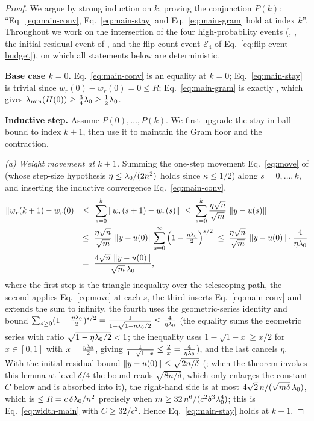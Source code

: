\begin{proof}
We argue by strong induction on $k$, proving the conjunction
$P(k)$: ``Eq.~\eqref{eq:main-conv}, Eq.~\eqref{eq:main-stay} and Eq.~\eqref{eq:main-gram} hold at index $k$''. Throughout we
work on the intersection of the four high-probability events (,
, the initial-residual event of , and the
flip-count event $\mathcal{E}_4$ of Eq.~\eqref{eq:flip-event-budget}), on which all statements
below are deterministic.

\smallskip\noindent\textbf{Base case $k = 0$.}
Eq.~\eqref{eq:main-conv} is an equality at $k=0$; Eq.~\eqref{eq:main-stay} is trivial since
$w_r(0) - w_r(0) = 0 \le R$; Eq.~\eqref{eq:main-gram} is exactly
, which gives $\lambda_{\min}(H(0)) \ge \tfrac34\lambda_{0} \ge \tfrac12\lambda_{0}$.

\smallskip\noindent\textbf{Inductive step.}
Assume $P(0), \dots, P(k)$. We first upgrade the stay-in-ball bound to index $k+1$, then use it
to maintain the Gram floor and the contraction.

\emph{(a) Weight movement at $k+1$.} Summing the one-step movement Eq.~\eqref{eq:move} of
 (whose step-size hypothesis $\eta \le \lambda_{0}/(2n^2)$ holds since
$\kappa \le 1/2$) along $s = 0, \dots, k$, and inserting the inductive convergence
Eq.~\eqref{eq:main-conv},
\begin{align}\label{eq:move-sum}
\left\|  w_r(k+1) - w_r(0)  \right\|
\;\le\; & ~ \sum_{s=0}^{k} \left\|  w_r(s+1) - w_r(s)  \right\|
\;\le\; \sum_{s=0}^{k} \frac{\eta\sqrt{n}}{\sqrt{m}}\, \left\|  y - u(s)  \right\| \\
\;\le\; & ~ \frac{\eta\sqrt{n}}{\sqrt{m}}\, \left\|  y - u(0)  \right\|
\sum_{s=0}^{\infty} \left( 1 - \tfrac{\eta\lambda_{0}}{2} \right)^{s/2}
\;\le\; \frac{\eta\sqrt{n}}{\sqrt{m}}\, \left\|  y - u(0)  \right\| \cdot \frac{4}{\eta\lambda_{0}} \\
\;=\; & ~ \frac{4 \sqrt{n}\, \left\|  y - u(0)  \right\|}{\sqrt{m}\, \lambda_{0}},
\end{align}
where the first step is the triangle inequality over the telescoping path, the second applies
Eq.~\eqref{eq:move} at each $s$, the third inserts Eq.~\eqref{eq:main-conv} and extends the sum
to infinity, the fourth uses the geometric-series identity and bound
$\sum_{s\ge0}(1 - \tfrac{\eta\lambda_{0}}{2})^{s/2} = \tfrac{1}{1 - \sqrt{1 - \eta\lambda_{0}/2}}
\le \tfrac{4}{\eta\lambda_{0}}$ (the equality sums the geometric series with ratio
$\sqrt{1-\eta\lambda_{0}/2}<1$; the inequality uses $1 - \sqrt{1 - x} \ge x/2$ for $x \in [0,1]$ with
$x = \tfrac{\eta\lambda_{0}}{2}$, giving $\tfrac{1}{1-\sqrt{1-x}}\le\tfrac2x=\tfrac{4}{\eta\lambda_{0}}$),
and the last cancels $\eta$. With the initial-residual bound
$\left\| y - u(0) \right\| \le \sqrt{2n/\delta}$ (; when the theorem invokes this
lemma at level $\delta/4$ the bound reads $\sqrt{8n/\delta}$, which only enlarges the constant
$C$ below and is absorbed into it), the right-hand side is at most
$4\sqrt{2}\, n / (\sqrt{m\delta}\,\lambda_{0})$, which is $\le R = c\,\delta\lambda_{0}/n^2$ precisely when
$m \ge 32\, n^6 / (c^2 \delta^3 \lambda_{0}^4)$; this is Eq.~\eqref{eq:width-main} with
$C \ge 32/c^2$. Hence Eq.~\eqref{eq:main-stay} holds at $k+1$.


\end{proof}
